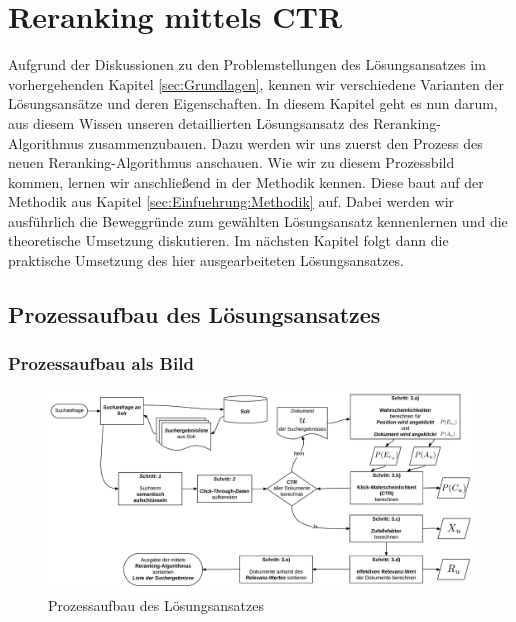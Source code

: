 %
\chapter{Reranking mittels CTR}
\label{sec:Reranking}

Aufgrund der Diskussionen zu den Problemstellungen des Lösungsansatzes im vorhergehenden Kapitel \ref{sec:Grundlagen}, kennen wir verschiedene Varianten der Lösungsansätze und deren Eigenschaften. In diesem Kapitel geht es nun darum, aus diesem Wissen unseren detaillierten Lösungsansatz des Reranking-Algorithmus zusammenzubauen. Dazu werden wir uns zuerst den Prozess des neuen Reranking-Algorithmus anschauen. Wie wir zu diesem Prozessbild kommen, lernen wir anschließend in der Methodik kennen. Diese baut auf der Methodik aus Kapitel \ref{sec:Einfuehrung:Methodik} auf. Dabei werden wir ausführlich die Beweggründe zum gewählten Lösungsansatz kennenlernen und die theoretische Umsetzung diskutieren. Im nächsten Kapitel folgt dann die praktische Umsetzung des hier ausgearbeiteten Lösungsansatzes.


\section{Prozessaufbau des Lösungsansatzes}
\label{sec:Reranking:Prozessaufbau}

\subsection{Prozessaufbau als Bild}
\label{sec:Reranking:Prozessaufbau:ProzessaufbauBild}

\begin{figure}[H]
\centering
\vspace{-1em}
\caption[Prozessaufbau des Lösungsansatzes]{Prozessaufbau des Lösungsansatzes}
\label{fig:Prozessaufbau}
\includegraphics[width=\linewidth]{gfx/ProzessaufbauBild}
\vspace{-2em}
\end{figure}
		
